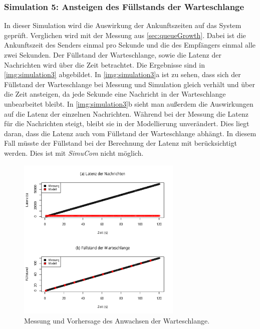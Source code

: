 \subsubsection{Simulation 5: Ansteigen des Füllstands der Warteschlange}
\label{sec:simulation3}
In dieser Simulation wird die Auswirkung der Ankunftszeiten auf das System geprüft. Verglichen wird mit der Messung aus \autoref{sec:queueGrowth}. Dabei ist die Ankunftszeit des Senders einmal pro Sekunde und die des Empfängers einmal alle zwei Sekunden. Der Füllstand der Warteschlange, sowie die Latenz der Nachrichten wird über die Zeit betrachtet.
Die Ergebnisse sind in \autoref{img:simulation3} abgebildet. In \autoref{img:simulation3}a ist zu sehen, dass sich der Füllstand der Warteschlange bei Messung und Simulation gleich verhält und über die Zeit ansteigen, da jede Sekunde eine Nachricht in der Warteschlange unbearbeitet bleibt. In \autoref{img:simulation3}b sieht man außerdem die Auswirkungen auf die Latenz der einzelnen Nachrichten. Während bei der Messung die Latenz für die Nachrichten steigt, bleibt sie in der Modellierung unverändert. Dies liegt daran, dass die Latenz auch vom Füllstand der Warteschlange abhängt. In diesem Fall müsste der Füllstand bei der Berechnung der Latenz mit berücksichtigt werden. Dies ist mit \emph{SimuCom} nicht möglich. 
\begin{figure}
\center
  \includegraphics[width=0.7\textwidth]{images/modelSimulationResults/simulation3.pdf}
  \caption{Messung und Vorhersage des Anwachsen der Warteschlange.}
  \label{img:simulation3}
\end{figure}

